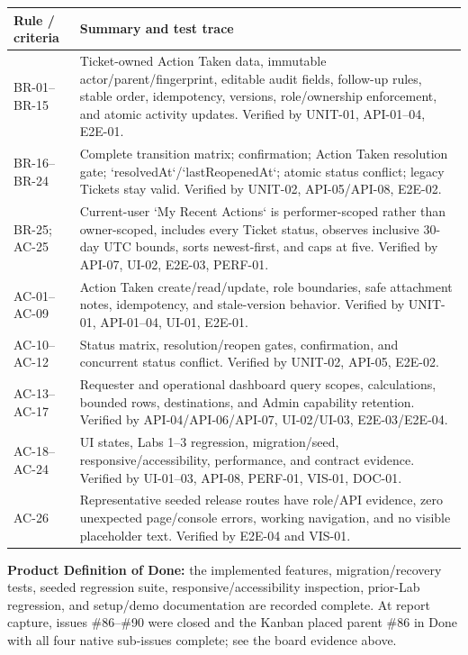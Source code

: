 \documentclass[10pt,a4paper]{article}
\begin{document}
\begin{center}\small
\begin{tabularx}{\linewidth}{@{}p{25mm}Y@{}}
\toprule
Rule / criteria & Summary and test trace \\
\midrule
BR-01--BR-15 & Ticket-owned Action Taken data, immutable actor/parent/fingerprint, editable audit fields, follow-up rules, stable order, idempotency, versions, role/ownership enforcement, and atomic activity updates. Verified by UNIT-01, API-01--04, E2E-01. \\
BR-16--BR-24 & Complete transition matrix; confirmation; Action Taken resolution gate; `resolvedAt`/`lastReopenedAt`; atomic status conflict; legacy Tickets stay valid. Verified by UNIT-02, API-05/API-08, E2E-02. \\
BR-25; AC-25 & Current-user `My Recent Actions` is performer-scoped rather than owner-scoped, includes every Ticket status, observes inclusive 30-day UTC bounds, sorts newest-first, and caps at five. Verified by API-07, UI-02, E2E-03, PERF-01. \\
AC-01--AC-09 & Action Taken create/read/update, role boundaries, safe attachment notes, idempotency, and stale-version behavior. Verified by UNIT-01, API-01--04, UI-01, E2E-01. \\
AC-10--AC-12 & Status matrix, resolution/reopen gates, confirmation, and concurrent status conflict. Verified by UNIT-02, API-05, E2E-02. \\
AC-13--AC-17 & Requester and operational dashboard query scopes, calculations, bounded rows, destinations, and Admin capability retention. Verified by API-04/API-06/API-07, UI-02/UI-03, E2E-03/E2E-04. \\
AC-18--AC-24 & UI states, Labs 1--3 regression, migration/seed, responsive/accessibility, performance, and contract evidence. Verified by UI-01--03, API-08, PERF-01, VIS-01, DOC-01. \\
AC-26 & Representative seeded release routes have role/API evidence, zero unexpected page/console errors, working navigation, and no visible placeholder text. Verified by E2E-04 and VIS-01. \\
\bottomrule
\end{tabularx}
\end{center}

\textbf{Product Definition of Done:} the implemented features, migration/recovery tests, seeded regression suite, responsive/accessibility inspection, prior-Lab regression, and setup/demo documentation are recorded complete. At report capture, issues \#86--\#90 were closed and the Kanban placed parent \#86 in Done with all four native sub-issues complete; see the board evidence above.
\end{document}
